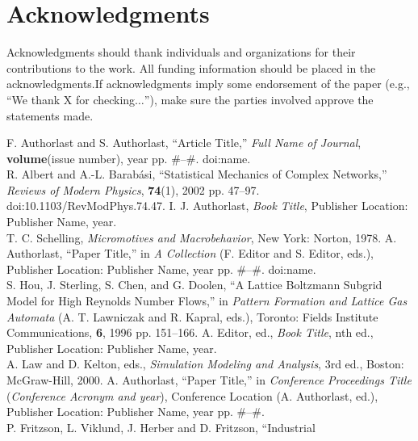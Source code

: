 \documentclass{article}
\begin{document}
\section*{Acknowledgments}
Acknowledgments should thank individuals and organizations for their contributions to the work. All funding information should be placed in the acknowledgments.If acknowledgments imply some endorsement of the paper (e.g., {``}We thank X for checking\(\ldots\){''}), make sure the parties involved approve the statements made.
\begin{thebibliography}{99}
F. Authorlast and S. Authorlast, ``Article Title,'' \textit{Full
Name of Journal}, \textbf{volume}(issue number), year pp. \#--\#.
doi:name.\\
R. Albert and A.-L. Barab{\' a}si, ``Statistical Mechanics of Complex
Networks,'' \textit{Reviews of Modern Physics}, \textbf{74}(1), 
2002 pp. 47--97.  doi:10.1103/RevModPhys.74.47.
I. J. Authorlast, \textit{Book Title}, Publisher Location: Publisher Name, year. \\
T. C. Schelling, \textit{Micromotives and Macrobehavior}, New York: Norton, 1978. 
A. Authorlast, ``Paper Title,'' in \textit{A Collection} (F. Editor and
S. Editor, eds.), Publisher Location: Publisher Name, year pp.
\#--\#. doi:name.\\
S. Hou, J. Sterling, S. Chen, and G. Doolen, ``A Lattice Boltzmann
Subgrid Model for High Reynolds Number Flows,'' in \textit{Pattern
Formation and Lattice Gas Automata} (A. T. Lawniczak and R. Kapral,
eds.), Toronto: Fields Institute Communications, \textbf{6}, 1996
pp. 151--166.
A. Editor, ed., \textit{Book Title}, nth ed., Publisher Location: Publisher Name, year. \\
A. Law and D. Kelton, eds., \textit{Simulation Modeling and
Analysis}, 3rd ed., Boston: McGraw-Hill, 2000.
A. Authorlast, ``Paper Title,'' in \textit{Conference Proceedings
Title} (\textit{Conference Acronym and year}), Conference Location
(A. Authorlast, ed.), Publisher Location: Publisher Name, year pp.
\#--\#.\\
P. Fritzson, L. Viklund, J. Herber and D. Fritzson, ``Industrial

\end{thebibliography}
\end{document}
